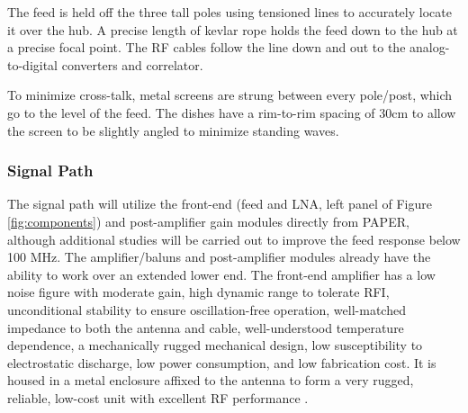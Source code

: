 \documentclass[preprint]{aastex}
\begin{document}
The feed is held off the three tall poles using tensioned lines to accurately locate it over the hub.  A precise 
length of kevlar rope holds the feed down to the hub at a precise focal point.  The RF cables follow the line 
down and out to the analog-to-digital converters and correlator.  

To minimize cross-talk, metal screens are strung between every pole/post, which go to the level of the feed.  
The dishes have a rim-to-rim spacing of 30cm to allow the screen to be slightly angled to minimize standing waves.


\vspace{-0.25in}
\subsubsection{Signal Path}
\vspace{-6pt}
The signal path will utilize the front-end (feed and LNA, left panel of Figure \ref{fig:components})
and post-amplifier gain modules directly
from PAPER, although additional studies will be carried out to improve the feed
response below 100 MHz. The amplifier/baluns and post-amplifier modules already have
the ability to work over an extended lower end. The front-end amplifier has a low
noise figure with moderate gain, high dynamic range to tolerate RFI, unconditional
stability to ensure oscillation-free operation, well-matched impedance to both the
antenna and cable, well-understood temperature dependence, a mechanically rugged
mechanical design, low susceptibility to electrostatic discharge, low power
consumption, and low fabrication cost. It is housed in a metal enclosure affixed to
the antenna to form a very rugged, reliable, low-cost unit with excellent RF
performance \citep{parsons_et_al2010}.
\end{document}
